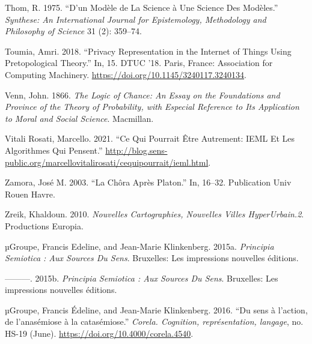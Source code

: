 \documentclass[
  letterpaper,
  DIV=11,
  numbers=noendperiod]{scrreprt}
\newlength{\cslhangindent}
\newlength{\cslentryspacingunit} %
\newenvironment{CSLReferences}[2] %
 {%
  \setlength{\parindent}{0pt}
  \ifodd #1
  \let\oldpar\par
  \def\par{\hangindent=\cslhangindent\oldpar}
  \fi
  \setlength{\parskip}{#2\cslentryspacingunit}
 }%
 {}
\begin{document}
\begin{CSLReferences}{1}{0}
\leavevmode{}%
Thom, R. 1975. {``D'un Modèle de La Science à Une Science Des
Modèles.''} \emph{Synthese: An International Journal for Epistemology,
Methodology and Philosophy of Science} 31 (2): 359--74.

\leavevmode{}%
Toumia, Amri. 2018. {``Privacy Representation in the Internet of Things
Using Pretopological Theory.''} In, 15. DTUC '18. Paris, France:
Association for Computing Machinery.
\url{https://doi.org/10.1145/3240117.3240134}.

\leavevmode{}%
Venn, John. 1866. \emph{The Logic of Chance: An Essay on the Foundations
and Province of the Theory of Probability, with Especial Reference to
Its Application to Moral and Social Science}. Macmillan.

\leavevmode{}%
Vitali Rosati, Marcello. 2021. {``Ce Qui Pourrait Être Autrement: IEML
Et Les Algorithmes Qui Pensent.''}
\url{http://blog.sens-public.org/marcellovitalirosati/cequipourrait/ieml.html}.

\leavevmode{}%
Zamora, José M. 2003. {``La Chôra Après Platon.''} In, 16--32.
Publication Univ Rouen Havre.

\leavevmode{}%
Zreik, Khaldoun. 2010. \emph{Nouvelles Cartographies, Nouvelles Villes
HyperUrbain.2}. Productions Europia.

\leavevmode{}%
µGroupe, Francis Edeline, and Jean-Marie Klinkenberg. 2015a.
\emph{Principia Semiotica : Aux Sources Du Sens}. Bruxelles: Les
impressions nouvelles éditions.

\leavevmode{}%
---------. 2015b. \emph{Principia Semiotica : Aux Sources Du Sens}.
Bruxelles: Les impressions nouvelles éditions.

\leavevmode{}%
µGroupe, Francis Édeline, and Jean-Marie Klinkenberg. 2016. {``Du sens à
l{'}action, de l{'}anasémiose à la catasémiose.''} \emph{Corela.
Cognition, représentation, langage}, no. HS-19 (June).
\url{https://doi.org/10.4000/corela.4540}.

\end{CSLReferences}
\end{document}
